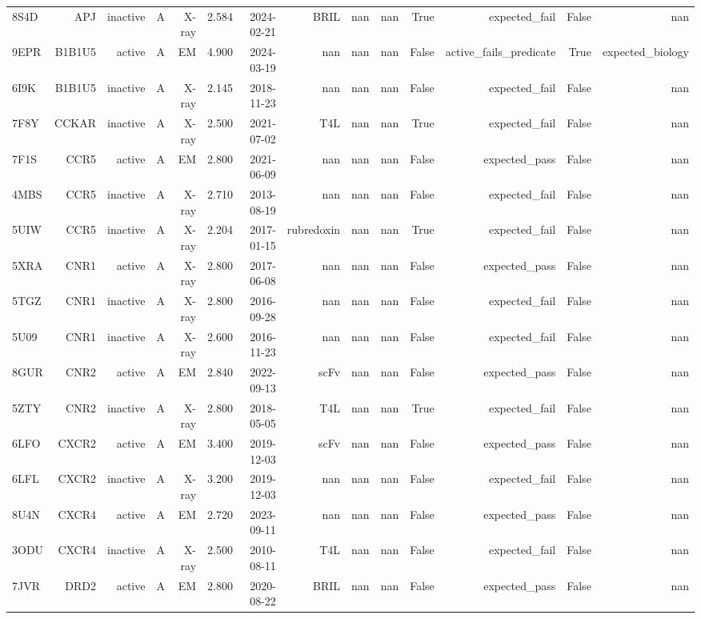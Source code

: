 \begin{longtable}{lrrrrrrrrrrrrr}
8S4D & APJ & inactive & A & X-ray & 2.584 & 2024-02-21 & BRIL & nan & nan & True & expected\_fail & False & nan \\
9EPR & B1B1U5 & active & A & EM & 4.900 & 2024-03-19 & nan & nan & nan & False & active\_fails\_predicate & True & expected\_biology \\
6I9K & B1B1U5 & inactive & A & X-ray & 2.145 & 2018-11-23 & nan & nan & nan & False & expected\_fail & False & nan \\
7F8Y & CCKAR & inactive & A & X-ray & 2.500 & 2021-07-02 & T4L & nan & nan & True & expected\_fail & False & nan \\
7F1S & CCR5 & active & A & EM & 2.800 & 2021-06-09 & nan & nan & nan & False & expected\_pass & False & nan \\
4MBS & CCR5 & inactive & A & X-ray & 2.710 & 2013-08-19 & nan & nan & nan & False & expected\_fail & False & nan \\
5UIW & CCR5 & inactive & A & X-ray & 2.204 & 2017-01-15 & rubredoxin & nan & nan & True & expected\_fail & False & nan \\
5XRA & CNR1 & active & A & X-ray & 2.800 & 2017-06-08 & nan & nan & nan & False & expected\_pass & False & nan \\
5TGZ & CNR1 & inactive & A & X-ray & 2.800 & 2016-09-28 & nan & nan & nan & False & expected\_fail & False & nan \\
5U09 & CNR1 & inactive & A & X-ray & 2.600 & 2016-11-23 & nan & nan & nan & False & expected\_fail & False & nan \\
8GUR & CNR2 & active & A & EM & 2.840 & 2022-09-13 & scFv & nan & nan & False & expected\_pass & False & nan \\
5ZTY & CNR2 & inactive & A & X-ray & 2.800 & 2018-05-05 & T4L & nan & nan & True & expected\_fail & False & nan \\
6LFO & CXCR2 & active & A & EM & 3.400 & 2019-12-03 & scFv & nan & nan & False & expected\_pass & False & nan \\
6LFL & CXCR2 & inactive & A & X-ray & 3.200 & 2019-12-03 & nan & nan & nan & False & expected\_fail & False & nan \\
8U4N & CXCR4 & active & A & EM & 2.720 & 2023-09-11 & nan & nan & nan & False & expected\_pass & False & nan \\
3ODU & CXCR4 & inactive & A & X-ray & 2.500 & 2010-08-11 & T4L & nan & nan & False & expected\_fail & False & nan \\
7JVR & DRD2 & active & A & EM & 2.800 & 2020-08-22 & BRIL & nan & nan & False & expected\_pass & False & nan \\

\end{longtable}
